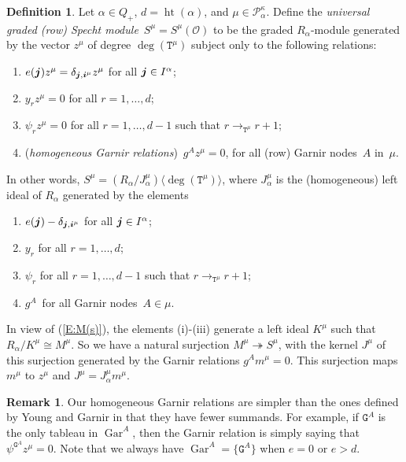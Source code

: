 \documentclass[twoside,11pt,reqno]{amsart}
\numberwithin{equation}{section}
\theoremstyle{definition}  %
\newtheorem{Definition}[equation]{Definition}
\newtheorem{Remark}[equation]{Remark}
\let\<\langle
\let\>\rangle
\def\bi{\text{\boldmath$i$}}
\def\bj{\text{\boldmath$j$}}
\newcommand{\0}{{\bar 0}}
\newcommand{\1}{{\bar 1}}
\newcommand{\al}{\alpha}
\newcommand{\de}{\delta}
\newcommand\Par[1][]{{\mathscr P}^{\kappa#1}}
\def\T{{\mathtt T}}
\def\G{{\mathtt G}}
\def\height{{\operatorname{ht}}}
\def\Gar{{\operatorname{Gar}}}
\def\onto{{\twoheadrightarrow}}
\renewcommand\O{\mathcal O}
\begin{document}
\begin{Definition} \label{DSpecht}%
Let $\al\in Q_+$, $d=\height(\al)$, and $\mu\in\Par_\al$. Define the {\em universal graded (row) Specht module}\, $S^\mu=S^\mu(\O)$ to be the graded $R_\al$-module generated  by the vector $z^\mu$ of degree $\deg(\T^\mu)$ subject only to the following relations:
\begin{enumerate}
\item[{\rm (i)}] $e(\bj)z^\mu=\de_{\bj,\bi^\mu} z^\mu$ for all $\bj\in I^\al$;
\item[{\rm (ii)}] $y_rz^\mu=0$ for all $r=1,\dots,d$;
\item[{\rm (iii)}] $\psi_rz^\mu=0$ for all $r=1,\dots,d-1$ such that  $r\rightarrow_{\T^\mu}  r+1$;
\item[{\rm (iv)}] ({\em homogeneous Garnir relations})\, $g^A z^\mu=0$, for all (row) Garnir nodes\, $A$ in~$\mu$. 
\end{enumerate}
\end{Definition}

In other words, $S^\mu= (R_\al/J_\al^\mu)\<\deg(\T^\mu)\>$, where $J_\al^\mu$ is the (homogeneous) left ideal of $R_\al$ generated by the elements 
\begin{enumerate}
\item[{\rm (i)}] $e(\bj)-\de_{\bj,\bi^\mu}$ for all $\bj\in I^\al$;
\item[{\rm (ii)}] $y_r$ for all $r=1,\dots,d$;
\item[{\rm (iii)}] $\psi_r$ for all $r=1,\dots,d-1$ such that  $r\rightarrow_{\T^\mu}  r+1$;
\item[{\rm (iv)}] $g^A$\, for all Garnir nodes\, $A\in \mu$. 
\end{enumerate}
In view of (\ref{E:M(s)}), the elements (i)-(iii) generate a left ideal $K^\mu$ such that $R_\al/K^\mu\cong
M^\mu$. So we have a natural surjection $M^\mu\onto S^\mu$, with the kernel $J^\mu$ of this
surjection generated by the Garnir relations $g^Am^\mu=0$. This surjection maps $m^\mu$ to $z^\mu$ and
$J^\mu=J_\al^\mu m^\mu$.

\begin{Remark} %
Our homogeneous Garnir relations are simpler than the ones defined by Young and Garnir in that they have fewer
summands. For example, if $\G^A$ is the only tableau in $\Gar^A$, then the Garnir relation is simply saying
that $\psi^{\G^A}z^\mu=0$. Note that we always have $\Gar^A=\{\G^A\}$ when $e=0$ or $e>d$. 
\end{Remark}
\end{document}
